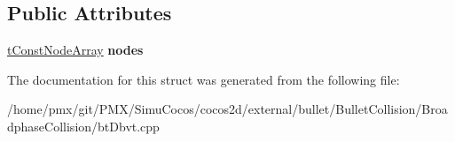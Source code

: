 \subsection*{Public Attributes}
\begin{DoxyCompactItemize}
\item 
\mbox{\label{structbtDbvtNodeEnumerator_ab590f9eec585fa983d962351f88a004e}} 
\hyperlink{classbtAlignedObjectArray}{t\+Const\+Node\+Array} {\bfseries nodes}
\end{DoxyCompactItemize}


The documentation for this struct was generated from the following file\+:\begin{DoxyCompactItemize}
\item 
/home/pmx/git/\+P\+M\+X/\+Simu\+Cocos/cocos2d/external/bullet/\+Bullet\+Collision/\+Broadphase\+Collision/bt\+Dbvt.\+cpp\end{DoxyCompactItemize}

